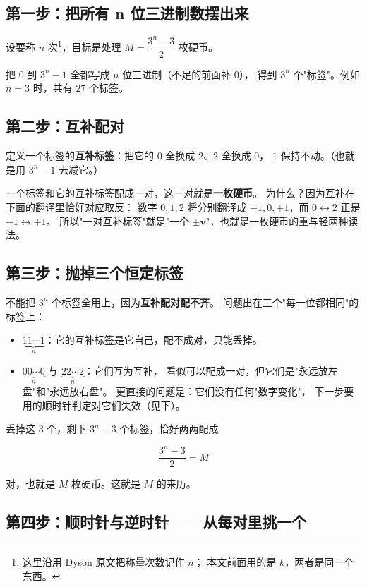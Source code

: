 \documentclass[UTF8,11pt,fontset=macnew]{ctexart}
\newcommand{\vv}{\mathbf{v}}
\begin{document}
\subsection{第一步：把所有 n 位三进制数摆出来}

设要称 $n$ 次\footnote{这里沿用 Dyson 原文把称量次数记作 $n$；
本文前面用的是 $k$，两者是同一个东西。}，目标是处理
$M=\dfrac{3^n-3}{2}$ 枚硬币。

把 $0$ 到 $3^n-1$ 全都写成 $n$ 位三进制（不足的前面补 $0$），
得到 $3^n$ 个"标签"。例如 $n=3$ 时，共有 $27$ 个标签。

\subsection{第二步：互补配对}

定义一个标签的\textbf{互补标签}：把它的 $0$ 全换成 $2$、$2$ 全换成 $0$，
$1$ 保持不动。（也就是用 $3^n-1$ 去减它。）

一个标签和它的互补标签配成一对，这一对就是\textbf{一枚硬币}。
为什么？因为互补在下面的翻译里恰好对应取反：
数字 $0,1,2$ 将分别翻译成 $-1,0,+1$，而 $0\leftrightarrow 2$ 正是 $-1\leftrightarrow+1$。
所以"一对互补标签"就是"一个 $\pm\vv$"，也就是一枚硬币的重与轻两种读法。

\subsection{第三步：抛掉三个恒定标签}

不能把 $3^n$ 个标签全用上，因为\textbf{互补配对配不齐}。
问题出在三个"每一位都相同"的标签上：

\begin{itemize}
  \item $\underbrace{11\cdots1}_{n}$：它的互补标签是它自己，配不成对，只能丢掉。
  \item $\underbrace{00\cdots0}_{n}$ 与 $\underbrace{22\cdots2}_{n}$：它们互为互补，
        看似可以配成一对，但它们是"永远放左盘"和"永远放右盘"。
        更直接的问题是：它们没有任何"数字变化"，
        下一步要用的顺时针判定对它们失效（见下）。
\end{itemize}

丢掉这 $3$ 个，剩下 $3^n-3$ 个标签，恰好两两配成

\[
\frac{3^n-3}{2}=M
\]

对，也就是 $M$ 枚硬币。这就是 $M$ 的来历。

\subsection{第四步：顺时针与逆时针——从每对里挑一个}
\end{document}
